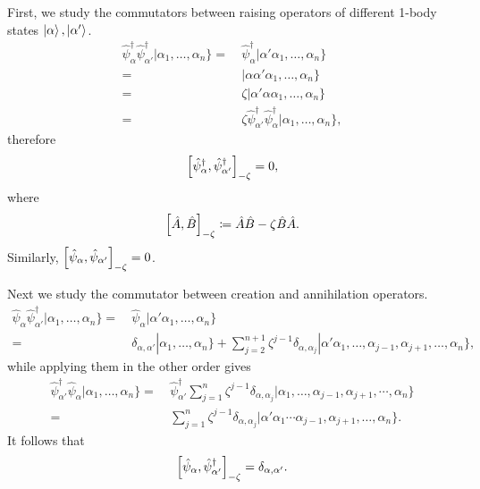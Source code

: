 \documentclass{article}
\theoremstyle{definition}
\numberwithin{equation}{section}
\begin{document}
First, we study the commutators 
between raising operators of different 
1-body states $\ket{\alpha},\ket{\alpha'}$.
\begin{align*}
    \hat{\psi}^{\dagger}_{\alpha}
    \hat{\psi}^{\dagger}_{\alpha'}
    |\alpha_1, \ldots ,\alpha_{n}\}
    =&\ 
    \hat{\psi}^{\dagger}_{\alpha}
    |\alpha' \alpha_1, \ldots ,\alpha_{n}\} \\
    =&\ 
    |\alpha \alpha' \alpha_1, \ldots ,\alpha_{n}\} \\
    =&\ 
    \zeta 
    |\alpha' \alpha \alpha_1, \ldots ,\alpha_{n}\} \\
    =&\ 
    \zeta
    \hat{\psi}^{\dagger}_{\alpha'}
    \hat{\psi}^{\dagger}_{\alpha}
    |\alpha_1, \ldots ,\alpha_{n}\},
\end{align*}
therefore 
\[
    \comm{\hat{\psi}^{\dagger}_{\alpha}}{
        \hat{\psi}^{\dagger}_{\alpha'}
    }_{-\zeta}
    = 0,
\]
where 
\[
    \comm{\hat{A}}{\hat{B}}_{-\zeta}
    \coloneqq
    \hat{A}\hat{B}-\zeta \hat{B} \hat{A}.
\]
Similarly, 
$\comm{\hat{\psi}_{\alpha}}{\hat{\psi}_{\alpha'}}_{-\zeta}=0$.


Next we study the commutator 
between creation and annihilation operators. 
\begin{align*}
    \hat{\psi}_{\alpha}
    \hat{\psi}^{\dagger}_{\alpha'}
    |\alpha_1, \ldots ,\alpha_n\}
    =&\ 
    \hat{\psi}_{\alpha}
    |\alpha'\alpha_1, \ldots ,\alpha_{n}\} \\
    =&\ 
    \delta_{\alpha,\alpha'}
    |\alpha_1, \ldots ,\alpha_{n}\}
    +
    \sum_{j=2}^{n+1}
    \zeta^{j-1}
    \delta_{\alpha,\alpha_{j}}
    |\alpha' \alpha_1, \ldots ,
    \alpha_{j-1},\alpha_{j+1}, \ldots ,\alpha_{n}\},
\end{align*}
while applying them in the other order gives
\begin{align*}
    \hat{\psi}^{\dagger}_{\alpha'}
    \hat{\psi}_{\alpha}
    |\alpha_1, \ldots ,\alpha_{n}\}
    =&\ 
    \hat{\psi}^{\dagger}_{\alpha'}
    \sum_{j=1}^{n}
    \zeta^{j-1}
    \delta_{\alpha,\alpha_{j}}
    |\alpha_1, \ldots ,\alpha_{j-1},\alpha_{j+1},
    \cdots ,\alpha_{n}\} \\
    =&\ 
    \sum_{j=1}^{n}\zeta^{j-1}\delta_{\alpha,\alpha_{j}}
    |\alpha'\alpha_{1}\cdots \alpha_{j-1},\alpha_{j+1}, \ldots ,\alpha_{n}\}.
\end{align*}
It follows that 
\[
    \comm{\hat{\psi}_{\alpha}}{\hat{\psi}^{\dagger}_{\alpha'}}
    _{-\zeta}
    =
    \delta_{\alpha,\alpha'}.
\]
\end{document}
